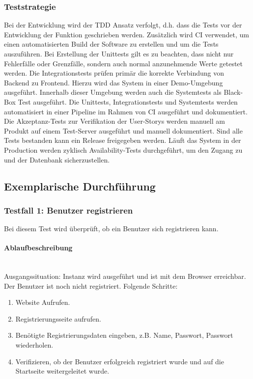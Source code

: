 \subsubsection*{Teststrategie}
Bei der Entwicklung wird der \ac{TDD} Ansatz verfolgt, d.h. dass die Tests vor der Entwicklung der Funktion geschrieben werden.
Zusätzlich wird \ac{CI} verwendet, um einen automatisierten Build der Software zu erstellen und um die Tests auszuführen.
Bei Erstellung der Unittests gilt es zu beachten, dass nicht nur Fehlerfälle oder Grenzfälle, sondern auch normal anzunehmende Werte getestet werden.
Die Integrationstests prüfen primär die korrekte Verbindung von Backend zu Frontend.
Hierzu wird das System in einer Demo-Umgebung ausgeführt.
Innerhalb dieser Umgebung werden auch die Systemtests als Black-Box Test ausgeführt.
\newparagraph
Die Unittests, Integrationstests und Systemtests werden automatisiert in einer Pipeline im Rahmen von \ac{CI} ausgeführt und dokumentiert.
Die Akzeptanz-Tests zur Verifikation der User-Storys werden manuell am Produkt auf einem Test-Server ausgeführt und manuell dokumentiert. 
Sind alle Tests bestanden kann ein Release freigegeben werden.
Läuft das System in der Production werden zyklisch Availability-Tests durchgeführt, um den Zugang zu  und der Datenbank sicherzustellen.
\subsection{Exemplarische Durchführung}
\subsubsection{Testfall 1: Benutzer registrieren}
Bei diesem Test wird überprüft, ob ein Benutzer sich registrieren kann.
\paragraph{Ablaufbeschreibung} \mbox{}\\
Ausgangssituation: Instanz wird ausgeführt und ist mit dem Browser erreichbar. Der Benutzer ist noch nicht registriert. Folgende Schritte:

\begin{enumerate}
  \item Website Aufrufen.
  \item Registrierungsseite aufrufen.
  \item Benötigte Registrierungsdaten eingeben, z.B. Name, Passwort, Passwort wiederholen.
  \item Verifizieren, ob der Benutzer erfolgreich registriert wurde und auf die Startseite weitergeleitet wurde.
\end{enumerate}

